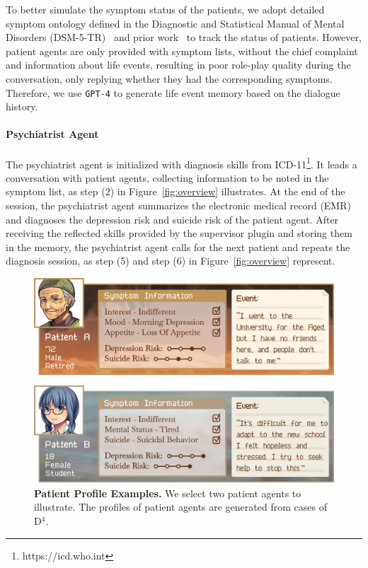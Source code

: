 To better simulate the symptom status of the patients, we adopt detailed symptom ontology defined in the Diagnostic and Statistical Manual of Mental Disorders (DSM-5-TR)~\cite{Arbanas2015DiagnosticAS} and prior work~\cite{Lan2024TowardsRA} to track the status of patients. However, patient agents are only provided with symptom lists, without the chief complaint and information about life events, resulting in poor role-play quality during the conversation, only replying whether they had the corresponding symptoms. Therefore, we use \texttt{GPT-4} to generate life event memory based on the dialogue history.

\paragraph{Psychiatrist Agent}
The psychiatrist agent is initialized with diagnosis skills from ICD-11\footnote{https://icd.who.int}. 
It leads a conversation with patient agents, collecting information to be noted in the symptom list, as step (2) in Figure~\ref{fig:overview} illustrates. At the end of the session, the psychiatrist agent summarizes the electronic medical record (EMR) and diagnoses the depression risk and suicide risk of the patient agent. After receiving the reflected skills provided by the supervisor plugin and storing them in the memory, the psychiatrist agent calls for the next patient and repeats the diagnosis session, as step (5) and step (6) in Figure~\ref{fig:overview} represent. 


\begin{figure}[!t]
    \centering
    \includegraphics[width=1\linewidth]{fig/profile_v2.png}
    \caption{\textbf{Patient Profile Examples.}  We select two patient agents to illustrate. The profiles of patient agents are generated from cases of D$^4$.}
    \label{fig:portrait}
\end{figure}


